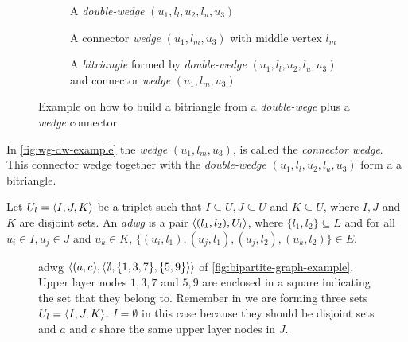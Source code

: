 \begin{figure}[htp!]
\begin{subfigure}[t]{0.5\textwidth}
\centering
{}
\caption[\acrshort{dwg} $(u_1,l_l,u_2,l_u,u_3)$]{A \emph{double-wedge} $(u_1,l_l,u_2,l_u,u_3)$}
\end{subfigure}\hfill
\begin{subfigure}[t]{0.5\textwidth}
\centering
{}
\caption[\acrshort{wg} $(u_1,l_m,u_3)$]{A connector \emph{wedge} $(u_1,l_m,u_3)$ with middle vertex $l_m$}
\end{subfigure}\hfill
%
\begin{subfigure}[t]{1\textwidth}
\centering
{}
\caption[\acrshort{bt} with connector]{A \emph{bitriangle} formed by \emph{double-wedge} $(u_1,l_l,u_2,l_u,u_3)$ and connector \emph{wedge} $(u_1,l_m,u_3)$}
\end{subfigure}
\caption[{[\acrshort{iebt}] Example of connector wedge}]{Example on how to build a bitriangle from a \emph{double-wege} plus a \emph{wedge} connector}
\label{fig:wg-dw-example}
\end{figure}
      
In \autoref{fig:wg-dw-example} the \emph{wedge} $(u_1,l_m,u_3)$, is called the \textit{connector wedge}. 
This connector wedge together with the \emph{double-wedge} $(u_1,l_l,u_2,l_u,u_3)$ form a  a bitriangle.  
      
\begin{definition}\label{def:adwg}
Let $U_l = \left\langle I, J, K\right\rangle$ be a triplet such that $I \subseteq U, J \subseteq U$ and $K \subseteq U$, where $I, J$ and $K$ are disjoint sets. 
An \textit{\acrfull{adwg}}  is a pair  $\left\langle (l_1, l_2), U_l \right\rangle$, where $\{l_1,l_2\}\subseteq L$ and  for all $u_i \in I, u_j \in J$ and $u_k \in K$, $\{(u_i, l_1), (u_j, l_1), (u_j, l_2), (u_k, l_2)\} \in E$.
\end{definition}
      
\begin{figure}[htp!]
\centering
{}
\caption[{[\acrshort{iebt}] Example Aggregated double-wedge}]{\acrlong{adwg} $\left\langle (a,c), \left\langle \emptyset, \{1,3,7\}, \{5,9\}\right\rangle \right\rangle$ of \autoref{fig:bipartite-graph-example}. Upper layer nodes $1,3,7$ and $5,9$ are enclosed in a square indicating the set that they belong to. Remember in  we are forming three sets $U_l = \left\langle I, J, K \right\rangle$. $I = \emptyset$ in this case because they should be disjoint sets and $a$ and $c$ share the same upper layer nodes in $J$.}
\label{fig:agg-double-wedge-example}
\end{figure}

